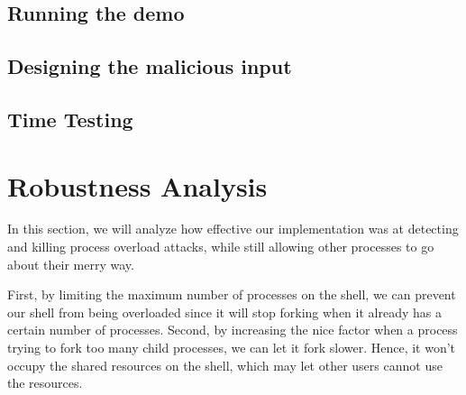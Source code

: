 \documentclass{article}
\begin{document}
\subsection{Running the demo}
\subsection{Designing the malicious input}
\subsection{Time Testing}




\section{Robustness Analysis}

In this section, we will analyze how effective our implementation was at
detecting and killing process overload attacks, while still allowing other processes to go about their merry way.


First, by limiting the maximum number of processes on the shell, we can prevent our shell from being overloaded since it will stop forking when it already has a certain number of processes.
Second, by increasing the nice factor when a process trying to fork too many child processes, we can let it fork slower.  Hence, it won’t occupy the shared resources on the shell, which may let other users cannot use the resources. \\ 
\end{document}

